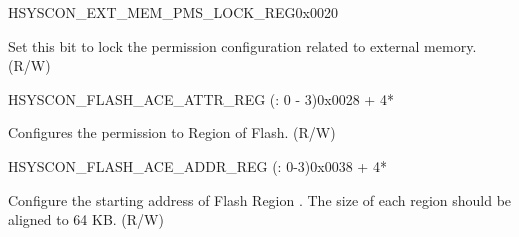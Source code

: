 















\begin{register}{H}{SYSCON\_EXT\_MEM\_PMS\_LOCK\_REG}{0x{}0020}\label{regdescSYSCONEXTMEMPMSLOCKREG}
%
%
\regnewline%
\begin{regdesc}\begin{reglist}
\label{fielddescSYSCONEXTMEMPMSLOCK}\item [SYSCON\_EXT\_MEM\_PMS\_LOCK] Set this bit to lock the permission configuration related to external memory. (R/W)
\end{reglist}\end{regdesc}
\end{register}




\begin{register}{H}{SYSCON\_FLASH\_ACE\_ATTR\_REG (: 0 - 3)}{0x{}0028 + 4*}\label{regdescSYSCONFLASHACEnATTRREG}
%
%
\regnewline%
\begin{regdesc}\begin{reglist}
\label{fielddescSYSCONFLASHACEnATTR}\item [SYSCON\_FLASH\_ACE\regindex{n}\_ATTR] Configures the permission to Region  of Flash. (R/W)
\end{reglist}\end{regdesc}
\end{register}

\begin{register}{H}{SYSCON\_FLASH\_ACE\_ADDR\_REG (: 0-3)}{0x{}0038 + 4*}\label{regdescSYSCONFLASHACEnADDRREG}
%
\regnewline%
\begin{regdesc}\begin{reglist}
\label{fielddescSYSCONFLASHACEnADDRS}\item [SYSCON\_FLASH\_ACE0\_ADDR\_S] Configure the starting address of Flash Region . The size of each region should be aligned to 64 KB. (R/W)
\end{reglist}\end{regdesc}
\end{register}


